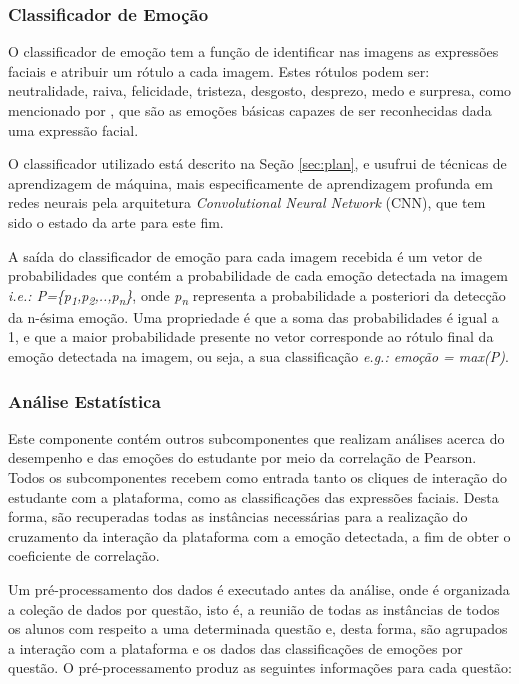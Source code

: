 \subsubsection{Classificador de Emoção}
O classificador de emoção tem a função de identificar nas imagens as expressões faciais e atribuir um rótulo a cada imagem. Estes rótulos podem ser: neutralidade, raiva, felicidade, tristeza, desgosto, desprezo, medo e surpresa, como mencionado por \cite{ekman1994}, que são as emoções básicas capazes de ser reconhecidas dada uma expressão facial.

O classificador utilizado está descrito na Seção \ref{sec:plan}, e usufrui de técnicas de aprendizagem de máquina, mais especificamente de aprendizagem profunda em redes neurais pela arquitetura \textit{Convolutional Neural Network} (CNN), que tem sido o estado da
arte para este fim.

A saída do classificador de emoção para cada imagem recebida é um vetor de probabilidades que contém a probabilidade de cada emoção detectada na imagem \textit{i.e.: P=\{p\textsubscript{1},p\textsubscript{2},..,p\textsubscript{n}\}}, onde \textit{p\textsubscript{n}} representa a probabilidade a posteriori da detecção da n-ésima emoção. Uma propriedade é que a soma das probabilidades é igual a 1, e que a maior probabilidade presente no vetor corresponde ao rótulo final da emoção detectada na imagem, ou seja, a sua classificação \textit{e.g.: emoção = max(P)}.

\subsubsection{Análise Estatística}
Este componente contém outros subcomponentes que realizam análises acerca do desempenho e das emoções do estudante por meio da correlação de Pearson. Todos os subcomponentes recebem como entrada tanto os cliques de interação do estudante com a plataforma, como as classificações das expressões faciais. Desta forma, são recuperadas todas as instâncias necessárias para a realização do cruzamento da interação da plataforma com a emoção detectada, a fim de obter o coeficiente de correlação.

Um pré-processamento dos dados é executado antes da análise, onde é organizada a coleção de dados por questão, isto é, a reunião de todas as instâncias de todos os alunos com respeito a uma determinada questão e, desta forma, são agrupados a interação com a plataforma e os dados das classificações de emoções por questão. O
pré-processamento produz as seguintes informações para cada questão:

